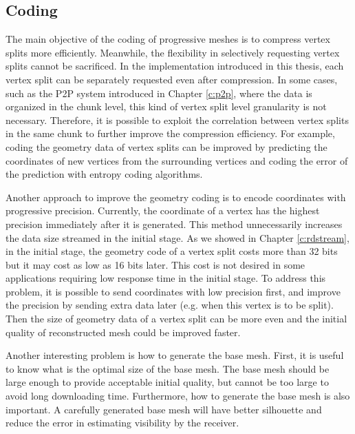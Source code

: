 \subsection{Coding}
The main objective of the coding of progressive meshes is to compress vertex splits more efficiently. 
Meanwhile, the flexibility in selectively requesting vertex splits cannot be sacrificed. 
In the implementation introduced in this thesis, 
each vertex split can be separately requested even after compression. 
In some cases, such as the P2P system introduced in Chapter \ref{c:p2p}, 
where the data is organized in the chunk level, 
this kind of vertex split level granularity is not necessary. 
Therefore, it is possible to exploit the correlation between vertex splits in the same chunk to further
improve the compression efficiency. 
For example, coding the geometry data of vertex splits can be improved by 
predicting the coordinates of new vertices from the surrounding vertices and coding the error of the prediction 
with entropy coding algorithms.

Another approach to improve the geometry coding is to encode coordinates with progressive precision. 
Currently, the coordinate of a vertex has the highest precision immediately after it is generated. 
This method unnecessarily increases the data size streamed in the initial stage.
As we showed in Chapter \ref{c:rdstream}, in the initial stage, 
the geometry code of a vertex split costs more than 32 bits but it may cost as low as 16 bits later.
This cost is not desired in some applications requiring low response time in the initial stage.
To address this problem, it is possible to send coordinates with low precision first, 
and improve the precision by sending extra data later (e.g. when this vertex is to be split). 
Then the size of geometry data of a vertex split can be more even 
and the initial quality of reconstructed mesh could be improved faster.

Another interesting problem is how to generate the base mesh. 
First, it is useful to know what is the optimal size of the base mesh.
The base mesh should be large enough to provide acceptable initial quality, 
but cannot be too large to avoid long downloading time.
Furthermore, how to generate the base mesh is also important. 
A carefully generated base mesh will have better silhouette and 
reduce the error in estimating visibility by the receiver.

